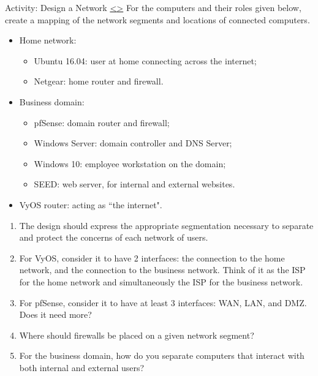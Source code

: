 \documentclass[12pt]{extarticle}
\newenvironment{instructionblock}{\Large\bgroup}{\egroup}
\newcommand{\ben}{\begin{enumerate}}
\newcommand{\een}{\end{enumerate}}
\begin{document}





\pagebreak
\begin{slide}{ Activity: Design a Network }{ \hyperref[slide 7]{\textless}\hyperref[slide 9]{\textgreater} }
\vskip 5pt
\begin{instructionblock}
 For the computers and their roles given below, create a mapping of the network segments and locations of connected computers.
\begin{itemize}
\item Home network:
    \begin{itemize}
        \item Ubuntu 16.04: user at home connecting across the internet;
        \item Netgear: home router and firewall.
    \end{itemize}
\item Business domain:
    \begin{itemize}
        \item pfSense: domain router and firewall;
        \item Windows Server: domain controller and DNS Server;
        \item Windows 10: employee workstation on the domain;
        \item SEED: web server, for internal and external websites.
    \end{itemize}
\item VyOS router: acting as ``the internet".
\end{itemize}
\end{instructionblock}
\end{slide}


\vspace{8mm}
\ben
    \item The design should express the appropriate segmentation necessary to separate and protect the concerns of each network of users.
    \item For VyOS, consider it to have 2 interfaces: the connection to the home network, and the connection to the business network. Think of it as the ISP for the home network and simultaneously the ISP for the business network.
    \item For pfSense, consider it to have at least 3 interfaces: WAN, LAN, and DMZ. Does it need more?
    \item Where should firewalls be placed on a given network segment?
    \item For the business domain, how do you separate computers that interact with both internal and external users?
\een
\end{document}
